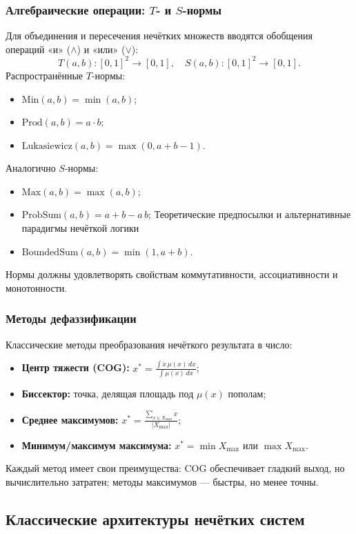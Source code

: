 \subsubsection{Алгебраические операции: \(T\)- и \(S\)-нормы}
Для объединения и пересечения нечётких множеств вводятся обобщения операций «и» (\(\land\)) и «или» (\(\lor\)):
\[
  T(a,b)\colon [0,1]^2\to[0,1],\quad
  S(a,b)\colon [0,1]^2\to[0,1].
\]
Распространённые \(T\)-нормы:
\begin{itemize}
  \item \(\mathrm{Min}(a,b)=\min(a,b)\);
  \item \(\mathrm{Prod}(a,b)=a\cdot b\);
  \item \(\mathrm{Lukasiewicz}(a,b)=\max(0,a+b-1)\).
\end{itemize}
Аналогично \(S\)-нормы:
\begin{itemize}
  \item \(\mathrm{Max}(a,b)=\max(a,b)\);
  \item \(\mathrm{ProbSum}(a,b)=a+b - a\,b\);
 Теоретические предпосылки и альтернативные
парадигмы нечёткой логики \item \(\mathrm{BoundedSum}(a,b)=\min(1,a+b)\).
\end{itemize}
Нормы должны удовлетворять свойствам коммутативности, ассоциативности и монотонности.

\subsubsection{Методы дефаззификации}
Классические методы преобразования нечёткого результата в число:
\begin{itemize}
  \item \textbf{Центр тяжести (COG):}
    \(x^* = \frac{\int x\,\mu(x)\,dx}{\int \mu(x)\,dx}\);
  \item \textbf{Биссектор:} точка, делящая площадь под \(\mu(x)\) пополам;
  \item \textbf{Среднее максимумов:} 
    \(x^* = \frac{\sum_{x\in X_{\max}} x}{|X_{\max}|}\);
  \item \textbf{Минимум/максимум максимума:} 
    \(x^* = \min X_{\max}\) или \(\max X_{\max}\).
\end{itemize}
Каждый метод имеет свои преимущества: COG обеспечивает гладкий выход, но вычислительно затратен; методы максимумов --- быстры, но менее точны.

\subsection{Классические архитектуры нечётких систем}
\label{subsec:architectures}

